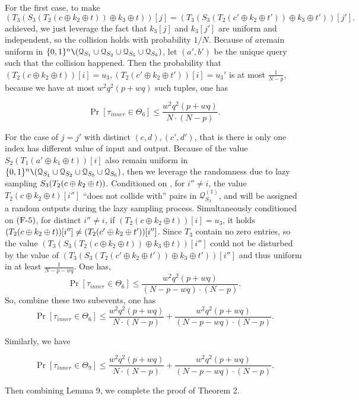 For the first case, to make 
$$
  \left(T_{3}\left(S_{3}\left(T_2\left(c \oplus k_{2} \oplus t\right)\right) \oplus k_{3} \oplus t\right)\right)[j] = \left(T_{3}\left(S_{3}\left(T_2\left(c' \oplus k_{2} \oplus t'\right)\right) \oplus k_{3} \oplus t'\right)\right)[j'].
$$
\noindent achieved, we just leverage the fact that $k_3[j]$ and $k_3[j']$ are uniform and independent, so the collision holds with probability $1/N$. Because of $a$remain uniform in $\{0, 1\}^{n} \verb|\| (\mathcal{Q}_{S_{1}} \cup \mathcal{Q}_{S_{2}} \cup \mathcal{Q}_{S_{5}} \cup\mathcal{Q}_{S_{6}})$, let $(a', b')$ be the unique query such that the collision happened. Then the probability that $\left(T_2\left(c \oplus k_{2} \oplus t\right)\right)[i] = u_3, \left(T_2\left(c' \oplus k_{2} \oplus t'\right)\right)[i] = u_3'$ is at most $\frac{1}{N-p}$, because we have at most $w^2 q^2(p+ w q)$ such tuples, one has

$$
\operatorname{Pr}\left[\tau_{inner} \in \Theta_{6}\right] \leq \frac{w^{2} q^{2} (p+w q)}{N \cdot (N-p)}.
$$

For the case of $j=j'$ with distinct $(c,d),(c',d')$, that is there is only one index has different value of input and output. Because of the value $S_{2}\left(T_1\left(a' \oplus k_{1} \oplus t\right)\right)[i]$ also remain uniform in $\{0, 1\}^{n} \verb|\| (\mathcal{Q}_{S_{1}} \cup \mathcal{Q}_{S_{2}} \cup \mathcal{Q}_{S_{5}} \cup \mathcal{Q}_{S_{6}})$, then we leverage the randomness due to lazy sampling $S_3(T_2(c\oplus k_2\oplus t))$. Conditioned on \feaiv, for $i''\neq i$, the value $T_2(c \oplus k_2 \oplus t)[i'']$ ``does not collide with'' pairs in $\mathcal{Q}_{S_{3}}^{(1)}$, and will be assigned a random outputs during the lazy sampling process. Simultaneously conditioned on $\text{(F-5)}$, for distinct $i'' \neq i$, if $(T_2\left(c \oplus k_{2} \oplus t\right))[i] = u_3$, it holds $(T_2(c\oplus k_2 \oplus t))[i'']\neq (T_2(c'\oplus k_2 \oplus t'))[i'']$. Since $T_3$ contain no zero entries, so the value $ \left(T_{3}\left(S_{3}\left(T_2\left(c \oplus k_{2} \oplus t\right)\right) \oplus k_{3} \oplus t\right)\right)[i'']$ could not be disturbed by the value of $ \left(T_{3}\left(S_{3}\left(T_2\left(c' \oplus k_{2} \oplus t'\right)\right) \oplus k_{3} \oplus t'\right)\right)[i'']$ and thus uniform in at least $\frac{1}{N - p- wq}$. One has,
$$
\operatorname{Pr}\left[\tau_{inner} \in \Theta_{6}\right] \leq \frac{w^{2} q^{2} (p+w q)}{(N- p- wq) \cdot (N-p)}.
$$
\noindent So, combine these two subevents, one has
$$
\operatorname{Pr}\left[\tau_{inner} \in \Theta_{6}\right] \leq \frac{w^{2} q^{2} (p+w q)}{N \cdot (N-p)} + \frac{w^{2} q^{2} (p+w q)}{(N- p- wq) \cdot (N- p)}.
$$

\noindent Similarly, we have

$$
\operatorname{Pr}\left[\tau_{inner} \in \Theta_{9}\right] \leq \frac{w^{2} q^{2} (p+w q)}{N \cdot (N-p)} + \frac{w^{2} q^{2} (p+w q)}{(N- p- wq) \cdot (N- p)}.
$$

\noindent Then combining Lemma 9, we complete the proof of Theorem 2.
















